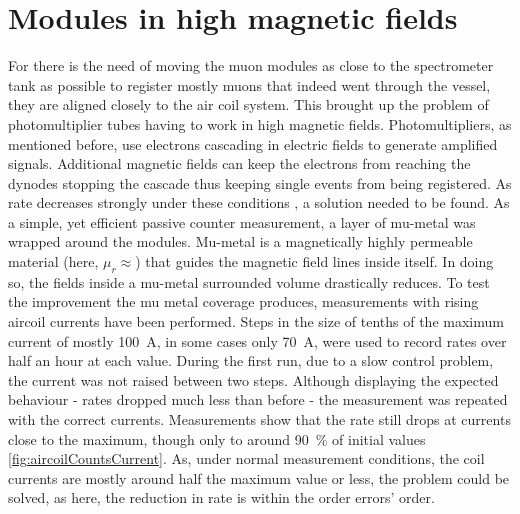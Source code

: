   \section{Modules in high magnetic fields}
  \label{ch:Analysis:sec:Modules in high magnetic fields}
  For there is the need of moving the muon modules as close to the spectrometer tank as possible to register mostly muons that indeed went through the vessel, they are aligned closely to the air coil system. This brought up the problem of photomultiplier tubes having to work in high magnetic fields. Photomultipliers, as mentioned before, use electrons cascading in electric fields to generate amplified signals. Additional magnetic fields can keep the electrons from reaching the dynodes stopping the cascade thus keeping single events from being registered. As rate decreases strongly under these conditions , a solution needed to be found. As a simple, yet efficient passive counter measurement, a layer of mu-metal was wrapped around the modules. Mu-metal is a magnetically highly permeable material (here, $\mu_r\approx $) that guides the magnetic field lines inside itself. In doing so, the fields inside a mu-metal surrounded volume 
  drastically reduces.
  To test the improvement the mu metal coverage produces, measurements with rising aircoil currents have been performed.
  Steps in the size of tenths of the maximum current of mostly \SI{100}{\ampere}, in some cases only \SI{70}{\ampere}, were used to record rates over half an hour at each value.
  During the first run, due to a slow control problem, the current was not raised between two steps. Although displaying the expected behaviour - rates dropped much less than before - the measurement was repeated with the correct currents.
  Measurements show that the rate still drops at currents close to the maximum, though only to around \SI{90}{\percent} of initial values \ref{fig:aircoilCountsCurrent}. As, under normal measurement conditions, the coil currents are mostly around half the maximum value or less, the problem could be solved, as here, the reduction in rate is within the order errors' order.
